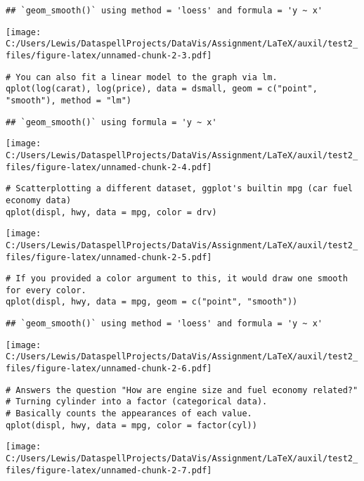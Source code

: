 \begin{verbatim}
## `geom_smooth()` using method = 'loess' and formula = 'y ~ x'
\end{verbatim}

\texttt{[image: C:/Users/Lewis/DataspellProjects/DataVis/Assignment/LaTeX/auxil/test2\_files/figure-latex/unnamed-chunk-2-3.pdf]}

\begin{verbatim}
# You can also fit a linear model to the graph via lm.
qplot(log(carat), log(price), data = dsmall, geom = c("point", "smooth"), method = "lm")
\end{verbatim}

\begin{verbatim}
## `geom_smooth()` using formula = 'y ~ x'
\end{verbatim}

\texttt{[image: C:/Users/Lewis/DataspellProjects/DataVis/Assignment/LaTeX/auxil/test2\_files/figure-latex/unnamed-chunk-2-4.pdf]}

\begin{verbatim}
# Scatterplotting a different dataset, ggplot's builtin mpg (car fuel economy data)
qplot(displ, hwy, data = mpg, color = drv)
\end{verbatim}

\texttt{[image: C:/Users/Lewis/DataspellProjects/DataVis/Assignment/LaTeX/auxil/test2\_files/figure-latex/unnamed-chunk-2-5.pdf]}

\begin{verbatim}
# If you provided a color argument to this, it would draw one smooth for every color.
qplot(displ, hwy, data = mpg, geom = c("point", "smooth"))
\end{verbatim}

\begin{verbatim}
## `geom_smooth()` using method = 'loess' and formula = 'y ~ x'
\end{verbatim}

\texttt{[image: C:/Users/Lewis/DataspellProjects/DataVis/Assignment/LaTeX/auxil/test2\_files/figure-latex/unnamed-chunk-2-6.pdf]}

\begin{verbatim}
# Answers the question "How are engine size and fuel economy related?"
# Turning cylinder into a factor (categorical data).
# Basically counts the appearances of each value.
qplot(displ, hwy, data = mpg, color = factor(cyl))
\end{verbatim}

\texttt{[image: C:/Users/Lewis/DataspellProjects/DataVis/Assignment/LaTeX/auxil/test2\_files/figure-latex/unnamed-chunk-2-7.pdf]}

